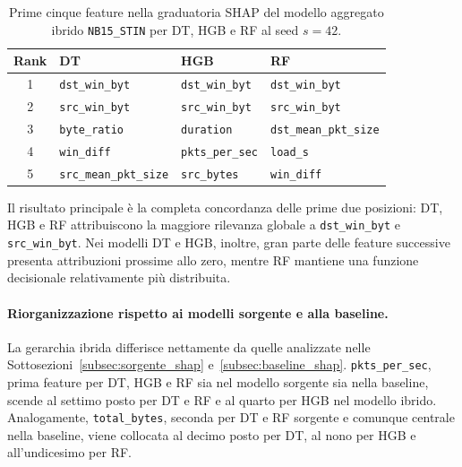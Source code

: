 \begin{table}[H]
    \centering
    \small
    \caption[Prime cinque feature nella graduatoria SHAP del modello aggregato ibrido \newline \texttt{NB15\_STIN} per DT, HGB e RF al seed $s=42$.]{Prime cinque feature nella graduatoria SHAP del modello aggregato ibrido \texttt{NB15\_STIN} per DT, HGB e RF al seed $s=42$.}
    \label{tab:ibridi_shap_top5}
    \begin{tabular}{c|lll}
        \toprule
        \textbf{Rank} & \textbf{DT} & \textbf{HGB} & \textbf{RF} \\
        \midrule
        1 & \texttt{dst\_win\_byt} & \texttt{dst\_win\_byt} & \texttt{dst\_win\_byt} \\
        2 & \texttt{src\_win\_byt} & \texttt{src\_win\_byt} & \texttt{src\_win\_byt} \\
        3 & \texttt{byte\_ratio} & \texttt{duration} & \texttt{dst\_mean\_pkt\_size} \\
        4 & \texttt{win\_diff} & \texttt{pkts\_per\_sec} & \texttt{load\_s} \\
        5 & \texttt{src\_mean\_pkt\_size} & \texttt{src\_bytes} & \texttt{win\_diff} \\
        \bottomrule
    \end{tabular}
\end{table}

Il risultato principale è la completa concordanza delle prime due posizioni: DT, HGB e RF attribuiscono la maggiore rilevanza globale a \texttt{dst\_win\_byt} e \texttt{src\_win\_byt}. 
Nei modelli DT e HGB, inoltre, gran parte delle feature successive presenta attribuzioni prossime allo zero, mentre RF mantiene una funzione decisionale relativamente più distribuita.

\paragraph{Riorganizzazione rispetto ai modelli sorgente e alla baseline.}
La gerarchia ibrida differisce nettamente da quelle analizzate nelle Sottosezioni~\ref{subsec:sorgente_shap} e~\ref{subsec:baseline_shap}.
\texttt{pkts\_per\_sec}, prima feature per DT, HGB e RF sia nel modello sorgente sia nella baseline, scende al settimo posto per DT e RF e al quarto per HGB nel modello ibrido. 
Analogamente, \texttt{total\_bytes}, seconda per DT e RF sorgente e comunque centrale nella baseline, viene collocata al decimo posto per DT, al nono per HGB e all'undicesimo per RF.


